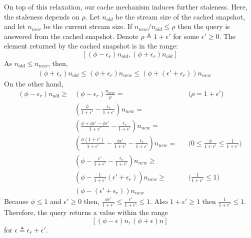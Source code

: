 On top of this relaxation, our cache mechanism induces further staleness. Here, the staleness depends on $\rho$. Let $n_{old}$ be the stream size of the cached snapshot, and let $n_{new}$ be the current stream size. If $n_{new} / n_{old} \leq \rho$ then the query is answered from the cached snapshot.
Denote $\rho \triangleq 1+\epsilon'$ for some $\epsilon' \geq 0 $. The element returned by the cached snapshot is in the range:
\begin{equation}
\left[\left(\phi-\epsilon_r\right)n_{old},\left(\phi+\epsilon_r\right)n_{old}\right]
\end{equation}
As $n_{old} \leq n_{new}$, then, 
\begin{align}
\left(\phi+\epsilon_r\right)n_{old} \leq \left(\phi+\epsilon_r\right)n_{new} \leq \left(\phi+\left(\epsilon'+\epsilon_r\right)\right)n_{new} &&
\end{align}
On the other hand, 
\begin{align}
\left(\phi-\epsilon_r\right)n_{old} \geq &\left(\phi-\epsilon_r\right)\frac{n_{new}}{\rho}= &&\text{($\rho = 1+\epsilon'$)} \\
&\left(\frac{\phi}{1+\epsilon'}-\frac{\epsilon_r}{1+\epsilon'}\right)n_{new}= && \\
&\left(\frac{\phi+\phi\epsilon'-\phi\epsilon'}{1+\epsilon'}-\frac{\epsilon_r}{1+\epsilon'}\right)n_{new}= && \\
&\left(\frac{\phi(1+\epsilon')}{1+\epsilon'}-\frac{\phi\epsilon'}{1+\epsilon'}-\frac{\epsilon_r}{1+\epsilon'}\right)n_{new}= &&\text{($0\leq \frac{\phi}{1+\epsilon'} \leq \frac{1}{1+\epsilon'}$)} \\
&\left(\phi-\frac{\epsilon'}{1+\epsilon'}-\frac{\epsilon_r}{1+\epsilon'}\right)n_{new} \geq && \\
&\left(\phi-\frac{1}{1+\epsilon'}\left(\epsilon'+\epsilon_r\right)\right)n_{new} \geq &&\text{($\frac{1}{1+\epsilon'} \leq 1$)} \\
&\left(\phi-\left(\epsilon'+\epsilon_r\right)\right)n_{new} &&
\end{align}
Because $\phi \leq 1$ and $\epsilon' \geq 0$ then, $\frac{\phi\epsilon'}{1+\epsilon'} \leq \frac{\epsilon'}{1+\epsilon'} \leq 1$. Also $1+\epsilon' \geq 1$ then $\frac{1}{1+\epsilon'} \leq 1$.\\
Therefore, the query returns a value within the range
\begin{equation}
    \left[\left(\phi-\epsilon \right)n,\left(\phi+\epsilon \right)n\right]
\end{equation}
for $\epsilon \triangleq \epsilon_r + \epsilon'$.

